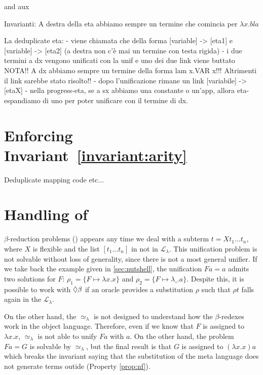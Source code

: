 \documentclass[sigconf,natbib=false,review]{acmart}
\newcommand{\UnifRel}{\ensuremath{\simeq}}
\newcommand{\Ue}{\ensuremath{\UnifRel_\lambda}\xspace}
\newcommand{\llambda}{\ensuremath{\mathcal{L}_\lambda}\xspace}
\begin{document}


and aux




Invarianti:
A destra della eta abbiamo sempre un termine che comincia per $\lambda x. bla$

\begin{textcode}
  La deduplicate eta:
  - viene chiamata che della forma [variable] -> [eta1] e [variable] -> [eta2]
    (a destra non c'è mai un termine con testa rigida)
  - i due termini a dx vengono unificati con la unif e uno dei due link viene buttato
    NOTA!! A dx abbiamo sempre un termine della forma lam x.VAR x!!!
    Altrimenti il link sarebbe stato risolto!!
  - dopo l'unificazione rimane un link [variabile] -> [etaX]
  - nella progress-eta, se a sx abbiamo una constante o un'app, allora eta-espandiamo
    di uno per poter unificare con il termine di dx.
\end{textcode}

\section{Enforcing Invariant~\ref{invariant:arity}}
\label{sec:invariant1}
Deduplicate mapping code etc...
  
\section{Handling of \maybebeta}\label{sec:beta}

$\beta$-reduction problems (\maybebeta) appears any time we deal with a subterm $t
= X t_1 \dots t_n$, where $X$ is flexible and the list $[t_1 \dots t_n]$ in not
in \llambda. This unification problem is not solvable without loss of
generality, since there is not a most general unifier. If we take back the
example given in \cref{sec:nutshell}, the unification $F a = a$ admits two solutions for $F$:
$\rho_1 = \{F \mapsto \lambda x.x\}$ and $\rho_2 = \{F \mapsto \lambda \_.a\}$.
Despite this, it is possible to work with $\Diamond\beta$ if an oracle provides a
substitution $\rho$ such that $\rho t$ falls again in the \llambda.

On the other hand, the \Ue is not designed to understand how the $\beta$-redexes
work in the object language. Therefore, even if we know that $F$ is assigned
to $\lambda x.x$, \Ue is not able to unify $F a$ with $a$. On the other hand,
the problem $F a = G$ is solvable by \Ue, but the final result is that $G$ is
assigned to $(\lambda x.x) a$ which breaks the invariant saying that the
substitution of the meta language does not generate terms outide \wellb{} (Property \ref{prop:nf}).
\end{document}
